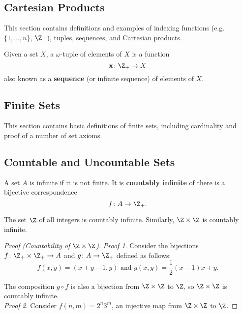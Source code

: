 \subsection{Cartesian Products}
This section contains definitions and examples of indexing functions (e.g. $\{ 1, \dots, n \}$, $\Z_+$), tuples, sequences, and Cartesian products.

\begin{definition}
Given a set $X$, a $\omega$-tuple of elements of $X$ is a function 
\[
    \mathbf{x} \colon \Z_+ \rightarrow X
\]
also known as a \textbf{sequence} (or infinite sequence) of elements of $X$.
\end{definition}

\subsection{Finite Sets}
This section contains basic definitions of finite sets, including cardinality and proof of a number of set axioms.

\subsection{Countable and Uncountable Sets}
\begin{definition}
A set $A$ is infinite if it is not finite. It is \textbf{countably infinite} of there is a bijective correspondence
\[
    f \colon A \rightarrow \Z_+.
\] 
\end{definition}

\begin{eg}
The set $\Z$ of all integers is countably infinite. Similarly, $\Z \times \Z$ is countably infinite. 
\end{eg}

\begin{proof}[Proof (Countability of $\Z \times \Z$)]
\textit{Proof 1}. Consider the bijections $f \colon \Z_+ \times \Z_+ \rightarrow A$ and $g \colon A \rightarrow \Z_+$ defined as follows:
\[
    f(x, y) = (x + y - 1, y) \text{ and } g(x, y) = \frac{1}{2}(x-1)x + y.    
\]
    
The composition $g \circ f$ is also a bijection from $\Z \times \Z$ to $\Z$, so $\Z \times \Z$ is countably infinite. \\

\textit{Proof 2}. Consider $f(n, m) = 2^n 3^m$, an injective map from $\Z \times \Z$ to $\Z$.
\end{proof}

